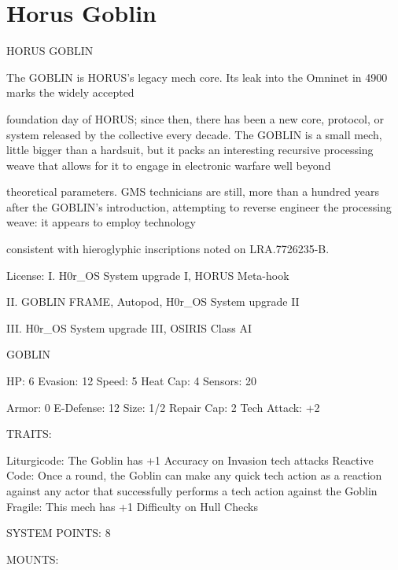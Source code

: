 \section{Horus Goblin}


                                          HORUS GOBLIN  

The GOBLIN is HORUS’s legacy mech core. Its leak into the Omninet in 4900 marks the widely accepted  

foundation day of HORUS; since then, there has been a new core, protocol, or system released by the  
collective every decade. The GOBLIN is a small mech, little bigger than a hardsuit, but it packs an  
interesting recursive processing weave that allows for it to engage in electronic warfare well beyond  

theoretical parameters. GMS technicians are still, more than a hundred years after the GOBLIN’s  
introduction, attempting to reverse engineer the processing weave: it appears to employ technology  

consistent with hieroglyphic inscriptions noted on LRA.7726235-B.       

                                                  License:  
I. H0r\_OS System upgrade I, HORUS Meta-hook
 
II. GOBLIN FRAME, Autopod, H0r\_OS System upgrade II
 
III. H0r\_OS System upgrade III, OSIRIS Class AI
 

                                                  GOBLIN 

  HP: 6          Evasion: 12                          Speed: 5           Heat Cap: 4       Sensors: 20 

  Armor: 0       E-Defense: 12                        Size: 1/2          Repair Cap: 2     Tech Attack:  
                                                                                           +2 

                                                   TRAITS: 

  Liturgicode: The Goblin has +1 Accuracy on Invasion tech attacks 
  Reactive Code: Once a round, the Goblin can make any quick tech action as a reaction against  
  any actor that successfully performs a tech action against the Goblin 
  Fragile: This mech has +1 Difficulty on Hull Checks 

                                            SYSTEM POINTS: 8 

                                                  MOUNTS: 

